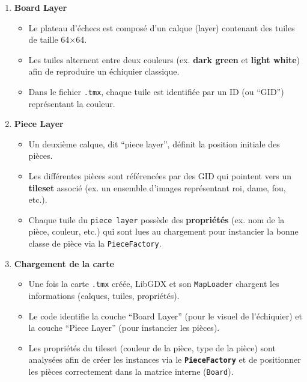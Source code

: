 \documentclass[11pt,a4paper]{article}
\begin{document}
\begin{enumerate}[label=\arabic*.]
    \item \textbf{Board Layer}
    \begin{itemize}
        \item Le plateau d’échecs est composé d’un calque (layer) contenant des tuiles de taille 64×64.
        \item Les tuiles alternent entre deux couleurs (ex. \textbf{dark green} et \textbf{light white}) afin de reproduire un échiquier classique.
        \item Dans le fichier \texttt{.tmx}, chaque tuile est identifiée par un ID (ou “GID”) représentant la couleur.
    \end{itemize}

    \item \textbf{Piece Layer}
    \begin{itemize}
        \item Un deuxième calque, dit “piece layer”, définit la position initiale des pièces.
        \item Les différentes pièces sont référencées par des GID qui pointent vers un \textbf{tileset} associé (ex. un ensemble d’images représentant roi, dame, fou, etc.).
        \item Chaque tuile du \texttt{piece layer} possède des \textbf{propriétés} (ex. nom de la pièce, couleur, etc.) qui sont lues au chargement pour instancier la bonne classe de pièce via la \texttt{PieceFactory}.
    \end{itemize}

    \item \textbf{Chargement de la carte}
    \begin{itemize}
        \item Une fois la carte \texttt{.tmx} créée, LibGDX et son \texttt{MapLoader} chargent les informations (calques, tuiles, propriétés).
        \item Le code identifie la couche “Board Layer” (pour le visuel de l’échiquier) et la couche “Piece Layer” (pour instancier les pièces).
        \item Les propriétés du tileset (couleur de la pièce, type de la pièce) sont analysées afin de créer les instances via le \textbf{\texttt{PieceFactory}} et de positionner les pièces correctement dans la matrice interne (\texttt{Board}).
    \end{itemize}


\end{enumerate}
\end{document}
